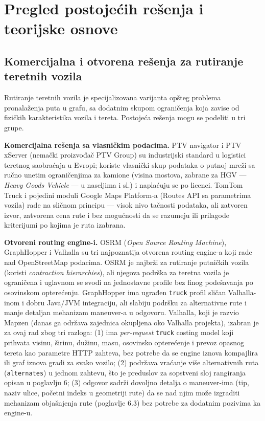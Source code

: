 \chapter{Pregled postojećih rešenja i teorijske osnove}

\section{Komercijalna i otvorena rešenja za rutiranje teretnih vozila}

Rutiranje teretnih vozila je specijalizovana varijanta opšteg problema pronalaženja puta u grafu, sa dodatnim skupom ograničenja koja zavise od fizičkih karakteristika vozila i tereta. Postojeća rešenja mogu se podeliti u tri grupe.

\textbf{Komercijalna rešenja sa vlasničkim podacima.} PTV navigator i PTV xServer (nemački proizvođač PTV Group) su industrijski standard u logistici teretnog saobraćaja u Evropi; koriste vlasnički skup podataka o putnoj mreži sa ručno unetim ograničenjima za kamione (visina mostova, zabrane za HGV — \emph{Heavy Goods Vehicle} — u naseljima i sl.) i naplaćuju se po licenci. TomTom Truck i pojedini moduli Google Maps Platform-a (Routes API sa parametrima vozila) rade na sličnom principu — visok nivo tačnosti podataka, ali zatvoren izvor, zatvorena cena rute i bez mogućnosti da se razumeju ili prilagode kriterijumi po kojima je ruta izabrana.

\textbf{Otvoreni routing engine-i.} OSRM (\emph{Open Source Routing Machine}), GraphHopper i Valhalla su tri najpoznatija otvorena routing engine-a koji rade nad OpenStreetMap podacima. OSRM je najbrži za rutiranje putničkih vozila (koristi \emph{contraction hierarchies}), ali njegova podrška za teretna vozila je ograničena i uglavnom se svodi na jednostavne profile bez finog podešavanja po osovinskom opterećenju. GraphHopper ima ugrađen \texttt{truck} profil sličan Valhalla-inom i dobru Java/JVM integraciju, ali slabiju podršku za alternativne rute i manje detaljan mehanizam maneuver-a u odgovoru. Valhalla, koji je razvio Mapzen (danas ga održava zajednica okupljena oko Valhalla projekta), izabran je za ovaj rad zbog tri razloga: (1) ima \emph{per-request} \texttt{truck} costing model koji prihvata visinu, širinu, dužinu, masu, osovinsko opterećenje i prevoz opasnog tereta kao parametre HTTP zahteva, bez potrebe da se engine iznova kompajlira ili graf iznova gradi za svako vozilo; (2) podržava vraćanje više alternativnih ruta (\texttt{alternates}) u jednom zahtevu, što je preduslov za sopstveni sloj rangiranja opisan u poglavlju 6; (3) odgovor sadrži dovoljno detalja o maneuver-ima (tip, naziv ulice, početni indeks u geometriji rute) da se nad njim može izgraditi mehanizam objašnjenja rute (poglavlje 6.3) bez potrebe za dodatnim pozivima ka engine-u.

